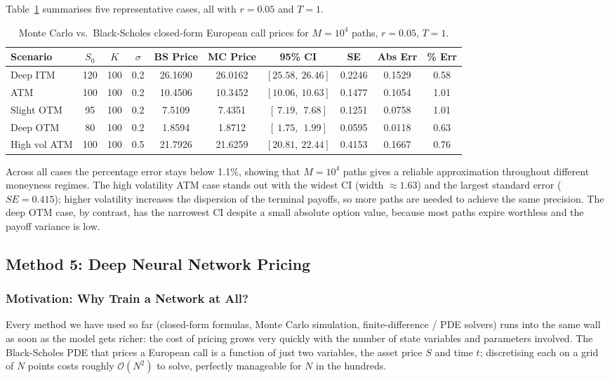 \documentclass[a4paper,11pt, titlepage]{article}
\theoremstyle{definition}
\theoremstyle{plain}
\theoremstyle{remark}
\begin{document}
Table~\ref{tab:mc_validation} summarises five representative cases, all with $r = 0.05$ and $T = 1$.

\begin{table}[htbp]
\centering
\caption{Monte Carlo vs.\ Black-Scholes closed-form European call prices for $M = 10^4$ paths, $r = 0.05$, $T = 1$.}
\label{tab:mc_validation}
\begin{tabular}{lccccccccc}
\toprule
Scenario & $S_0$ & $K$ & $\sigma$ & BS Price & MC Price & 95\% CI & SE & Abs Err & \% Err \\
\midrule
Deep ITM     & 120 & 100 & 0.2 & 26.1690 & 26.0162 & $[25.58,\ 26.46]$ & 0.2246 & 0.1529 & 0.58 \\
ATM          & 100 & 100 & 0.2 & 10.4506 & 10.3452 & $[10.06,\ 10.63]$ & 0.1477 & 0.1054 & 1.01 \\
Slight OTM   &  95 & 100 & 0.2 &  7.5109 &  7.4351 & $[\ 7.19,\ \ 7.68]$ & 0.1251 & 0.0758 & 1.01 \\
Deep OTM     &  80 & 100 & 0.2 &  1.8594 &  1.8712 & $[\ 1.75,\ \ 1.99]$ & 0.0595 & 0.0118 & 0.63 \\
High vol ATM & 100 & 100 & 0.5 & 21.7926 & 21.6259 & $[20.81,\ 22.44]$ & 0.4153 & 0.1667 & 0.76 \\
\bottomrule
\end{tabular}
\end{table}

Across all cases the percentage error stays below 1.1\%, showing that $M = 10^4$ paths gives a reliable approximation throughout different moneyness regimes. The high volatility ATM case stands out with the widest CI (width $\approx 1.63$) and the largest standard error ($SE = 0.415$); higher volatility increases the dispersion of the terminal payoffs, so more paths are needed to achieve the same precision. The deep OTM case, by contrast, has the narrowest CI despite a small absolute option value, because most paths expire worthless and the payoff variance is low.

\FloatBarrier
\subsection{Method 5: Deep Neural Network Pricing}
\label{sec:dnn_bs}

\subsubsection{Motivation: Why Train a Network at All?}

Every method we have used so far (closed-form formulas, Monte Carlo simulation, finite-difference / PDE solvers) runs into the same wall as soon as the model gets richer: the cost of pricing grows very quickly with the number of state variables and parameters involved. The Black-Scholes PDE that prices a European call is a function of just two variables, the asset price $S$ and time $t$; discretising each on a grid of $N$ points costs roughly $\mathcal{O}(N^2)$ to solve, perfectly manageable for $N$ in the hundreds.
\end{document}
